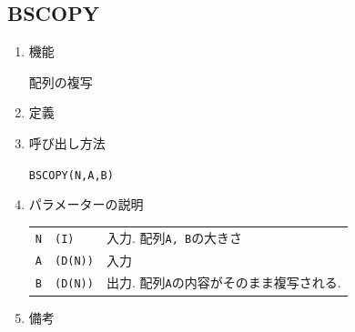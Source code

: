 
\subsection{BSCOPY}

\begin{enumerate}

\item 機能 

配列の複写

\item 定義

\item 呼び出し方法 
    
{\tt BSCOPY(N,A,B)}
  
\item パラメーターの説明 
    
\begin{tabular}{lll}
{\tt N} & {\tt (I)} & 入力. 配列{\tt A, B}の大きさ\\
{\tt A} & {\tt (D(N))} & 入力\\
{\tt B} & {\tt (D(N))} & 出力. 配列{\tt A}の内容がそのまま複写される.
\end{tabular}

\item 備考

\end{enumerate}


